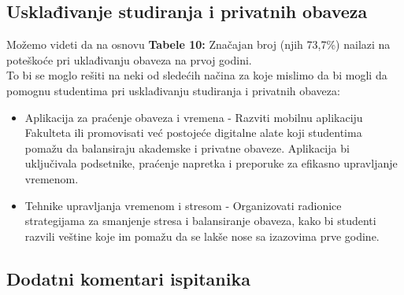 \documentclass[a4paper]{article}
\begin{document}
\subsection{\textbf{Usklađivanje studiranja i privatnih obaveza}}

Možemo videti da na osnovu \textbf{Tabele 10:} Značajan broj (njih 73,7\%) nailazi na poteškoće pri uklađivanju obaveza na prvoj godini.\\

To bi se moglo rešiti na neki od sledećih načina  za koje mislimo da bi mogli da pomognu studentima pri usklađivanju studiranja i privatnih obaveza:\\

\begin{itemize}
    \item Aplikacija za praćenje obaveza i vremena - Razviti mobilnu aplikaciju Fakulteta ili promovisati već postojeće digitalne alate koji studentima pomažu da balansiraju akademske i privatne obaveze. Aplikacija bi uključivala podsetnike, praćenje napretka i preporuke za efikasno upravljanje vremenom.
    \item Tehnike upravljanja vremenom i stresom - Organizovati radionice strategijama za smanjenje stresa i balansiranje obaveza, kako bi studenti razvili veštine koje im pomažu da se lakše nose sa izazovima prve godine.\\
\end{itemize}



\begin{table}[H]
\centering %
\caption{Usklađivanje studiranja i privatnih obaveza}
\end{table}


\subsection{\textbf{Dodatni komentari ispitanika}}
\end{document}
